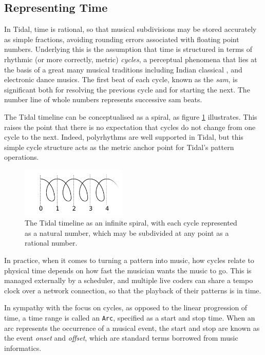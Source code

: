 \documentclass[authoryear]{sigplanconf}
\begin{document}
\subsection{Representing Time}

In Tidal, time is rational, so that musical subdivisions may be stored
accurately as simple fractions, avoiding rounding errors associated
with floating point numbers. Underlying this is the assumption that
time is structured in terms of rhythmic (or more correctly, metric)
\emph{cycles}, a perceptual phenomena that lies at the basis of a
great many musical traditions including Indian classical
\citep{Clayton08}, and electronic dance musics. The first beat of each
cycle, known as the \emph{sam}, is significant both for resolving the
previous cycle and for starting the next. The number line of whole
numbers represents successive sam beats. 

The Tidal timeline can be conceptualised as a spiral, as figure
\ref{fig:spiral} illustrates. This raises the point that there is no
expectation that cycles do not change from one cycle to the
next. Indeed, polyrhythms are well supported in Tidal, but this simple
cycle structure acts as the metric anchor point for Tidal's pattern
operations.


\begin{figure}[t]
    \centering
\includegraphics[width=0.45\textwidth]{images/spiral.pdf}
    \caption{The Tidal timeline as an infinite spiral, with each cycle represented as a natural number, which may be subdivided at any point as a rational number.}
    \label{fig:spiral}
\end{figure}

In practice, when it comes to turning a pattern into music, how cycles
relate to physical time depends on how fast the musician wants the
music to go. This is managed externally by a scheduler, and multiple
live coders can share a tempo clock over a network connection, so that
the playback of their patterns is in time.

In sympathy with the focus on cycles, as opposed to the linear
progression of time, a time range is called an \lstinline{Arc},
specified as a start and stop time. When an arc represents the
occurrence of a musical event, the start and stop are known as the
event \emph{onset} and \emph{offset}, which are standard terms
borrowed from music informatics.
\end{document}
